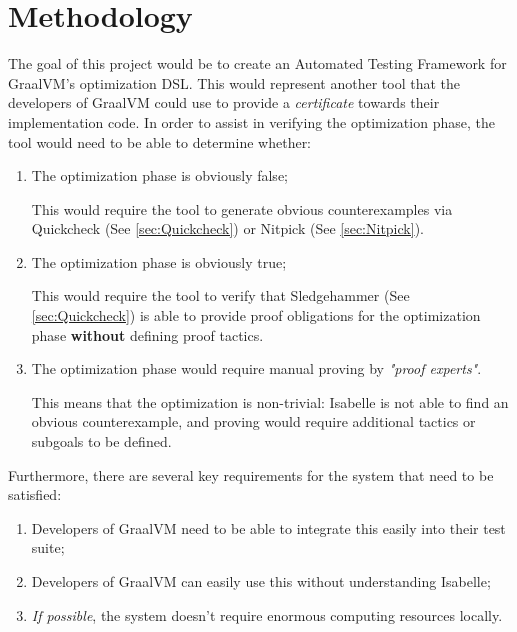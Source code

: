 \section{Methodology}

The goal of this project would be to create an Automated Testing Framework for GraalVM's optimization DSL. This would represent another tool that the 
developers of GraalVM could use to provide a \emph{certificate} towards their implementation code. In order to assist in verifying the optimization 
phase, the tool would need to be able to determine whether:

\begin{enumerate}
    \item The optimization phase is obviously false;
    
          This would require the tool to generate obvious counterexamples via Quickcheck (See \ref{sec:Quickcheck}) or Nitpick (See \ref{sec:Nitpick}).

    \item The optimization phase is obviously true;
    
          This would require the tool to verify that Sledgehammer (See \ref{sec:Quickcheck}) is able to provide proof obligations for the 
          optimization phase \textbf{without} defining proof tactics.

    \item The optimization phase would require manual proving by \emph{"proof experts"}.
          
          This means that the optimization is non-trivial: Isabelle is not able to find an obvious counterexample, and proving would require 
          additional tactics or subgoals to be defined.

\end{enumerate}

Furthermore, there are several key requirements for the system that need to be satisfied:

\begin{enumerate}
      \item Developers of GraalVM need to be able to integrate this easily into their test suite;
      \item Developers of GraalVM can easily use this without understanding Isabelle;
      \item \emph{If possible}, the system doesn't require enormous computing resources locally.
\end{enumerate}

